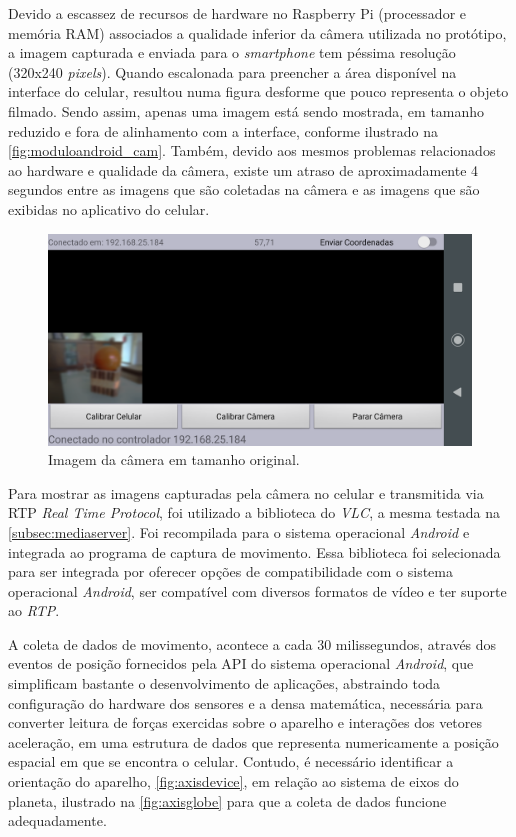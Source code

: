 Devido a escassez de recursos de hardware no Raspberry Pi (processador e memória RAM) associados a qualidade inferior da câmera utilizada no protótipo, a imagem capturada e enviada para o \textit{smartphone} tem péssima resolução (320x240 \textit{pixels}). Quando escalonada para preencher a área disponível na interface do celular, resultou numa figura desforme que pouco representa o objeto filmado. Sendo assim, apenas uma imagem está sendo mostrada, em tamanho reduzido e fora de alinhamento com a interface, conforme ilustrado na \autoref{fig:moduloandroid_cam}. Também, devido aos mesmos problemas relacionados ao hardware e qualidade da câmera, existe um atraso de aproximadamente 4 segundos entre as imagens que são coletadas na câmera e as imagens que são exibidas no aplicativo do celular.

\begin{figure}[H]
	\centering
	\includegraphics[width=1\textwidth]{figuras/modulo_android_2.png}
	\caption{Imagem da câmera em tamanho original.}
	\label{fig:moduloandroid_cam}
\end{figure}

Para mostrar as imagens capturadas pela câmera no celular e transmitida via RTP \textit{Real Time Protocol}, foi utilizado a biblioteca do \textit{VLC}, a mesma testada na \autoref{subsec:mediaserver}. Foi recompilada para o sistema operacional \textit{Android} e integrada ao programa de captura de movimento. Essa biblioteca foi selecionada para ser integrada por oferecer opções de compatibilidade com o sistema operacional \textit{Android}, ser compatível com diversos formatos de vídeo e ter suporte ao \textit{RTP}.\par

A coleta de dados de movimento, acontece a cada 30 milissegundos, através dos eventos de posição fornecidos pela API do sistema operacional \textit{Android}, que simplificam bastante o desenvolvimento de aplicações, abstraindo toda configuração do hardware dos sensores e a densa matemática, necessária para converter leitura de forças exercidas sobre o aparelho e interações dos vetores aceleração, em uma estrutura de dados que representa numericamente a posição espacial em que se encontra o celular. Contudo, é necessário identificar a orientação do aparelho, \autoref{fig:axisdevice}, em relação ao sistema de eixos do planeta, ilustrado na \autoref{fig:axisglobe} para que a coleta de dados funcione adequadamente.\par

